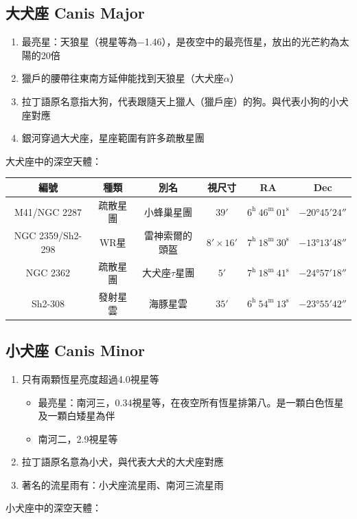 \subsection{大犬座 Canis Major}
\begin{enumerate}
    \item 最亮星：天狼星（視星等為−1.46），是夜空中的最亮恆星，放出的光芒約為太陽的20倍
    \item 獵戶的腰帶往東南方延伸能找到天狼星（大犬座\(\alpha\)）
    \item 拉丁語原名意指大狗，代表跟隨天上獵人（獵戶座）的狗。與代表小狗的小犬座對應
    \item 銀河穿過大犬座，星座範圍有許多疏散星團
\end{enumerate}
大犬座中的深空天體：

\begin{center}
\begin{longtable}{c | c | c | c | c | c}
    編號 & 種類 & 別名 & 視尺寸 & RA & Dec \\
    \hline
    \endfirsthead


    \endfoot

    \endlastfoot

    M41/NGC 2287 & 疏散星團 & 小蜂巢星團 & \(\ang{;39;}\) & \(6^\text{h }46^\text{m }01^\text{s}\) & \(-\ang{20;45;24}\) \\
    NGC 2359/Sh2-298 & WR星 & 雷神索爾的頭盔 & \(\ang{;8;}\times\ang{;16;}\) & \(7^\text{h }18^\text{m }30^\text{s}\) & \(-\ang{13;13;48}\) \\
    NGC 2362 & 疏散星團 & 大犬座\(\tau\)星團 & \(\ang{;5;}\) & \(7^\text{h }18^\text{m }41^\text{s}\) & \(-\ang{24;57;18}\) \\
    Sh2-308 & 發射星雲 & 海豚星雲 & \(\ang{;35;}\) & \(6^\text{h }54^\text{m }13^\text{s}\) & \(-\ang{23;55;42}\) \\
\end{longtable}
\end{center}

\subsection{小犬座 Canis Minor}
\begin{enumerate}
    \item 只有兩顆恆星亮度超過4.0視星等
        \begin{itemize}
            \item 最亮星：南河三，0.34視星等，在夜空所有恆星排第八。是一顆白色恆星及一顆白矮星為伴
            \item 南河二，2.9視星等
        \end{itemize}
    \item 拉丁語原名意為小犬，與代表大犬的大犬座對應
    \item 著名的流星雨有：小犬座流星雨、南河三流星雨
\end{enumerate}
小犬座中的深空天體：

